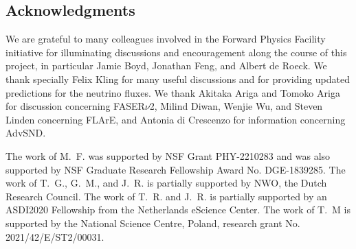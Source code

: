 \subsection*{Acknowledgments}
%
We are grateful to many colleagues involved in the Forward
Physics Facility initiative for illuminating
discussions and encouragement along the course of this project,
in particular Jamie Boyd, Jonathan Feng, and Albert de Roeck.
%
We thank specially Felix Kling for many useful discussions
and for providing updated predictions for the neutrino fluxes.
%
We thank Akitaka Ariga and Tomoko Ariga for discussion
concerning FASER$\nu$2, Milind Diwan,
Wenjie Wu, and Steven Linden concerning FLArE,
and Antonia di Crescenzo for information concerning AdvSND.


The work of M.~F. was supported by NSF Grant PHY-2210283 and was also supported by NSF Graduate Research Fellowship Award No. DGE-1839285.
%
The work of T.~G., G.~M., and J.~R. is partially supported by NWO, the Dutch Research Council.
%
The work of T.~R. and J.~R. is partially supported by an ASDI2020
Fellowship from the Netherlands eScience Center.
%
The work of T.~M is supported by the National Science Centre, Poland, research grant No. 2021/42/E/ST2/00031.
